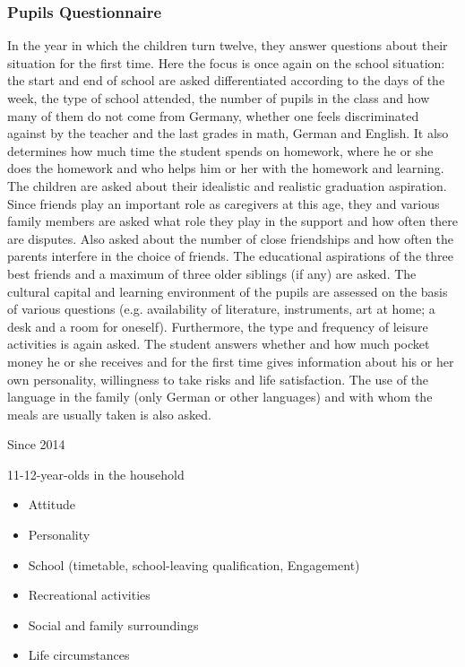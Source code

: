 \documentclass[letterpaper,10pt,openany,onesideH,english]{sphinxmanual}
\begin{document}
\subsubsection{Pupils Questionnaire}
\label{\detokenize{Contents of SOEPcore/index:pupils-questionnaire}}\label{\detokenize{Contents of SOEPcore/index:id25}}
In the year in which the children turn twelve, they answer questions about their situation for the first time. Here the focus is once again on the school situation: the start and end of school are asked differentiated according to the days of the week, the type of school attended, the number of pupils in the class and how many of them do not come from Germany, whether one feels discriminated against by the teacher and the last grades in math, German and English. It also determines how much time the student spends on homework, where he or she does the homework and who helps him or her with the homework and learning. The children are asked about their idealistic and realistic graduation aspiration. Since friends play an important role as caregivers at this age, they and various family members are asked what role they play in the support and how often there are disputes. Also asked about the number of close friendships and how often the parents interfere in the choice of friends. The educational aspirations of the three best friends and a maximum of three older siblings (if any) are asked. The cultural capital and learning environment of the pupils are assessed on the basis of various questions (e.g. availability of literature, instruments, art at home; a desk and a room for oneself). Furthermore, the type and frequency of leisure activities is again asked. The student answers whether and how much pocket money he or she receives and for the first time gives information about his or her own personality, willingness to take risks and life satisfaction. The use of the language in the family (only German or other languages) and with whom the meals are usually taken is also asked.

 Since 2014

 11-12-year-olds in the household

\begin{itemize}
\item {} 
Attitude

\item {} 
Personality

\item {} 
School (timetable, school-leaving qualification, Engagement)

\item {} 
Recreational activities

\item {} 
Social and family surroundings

\item {} 
Life circumstances

\end{itemize}
\end{document}
